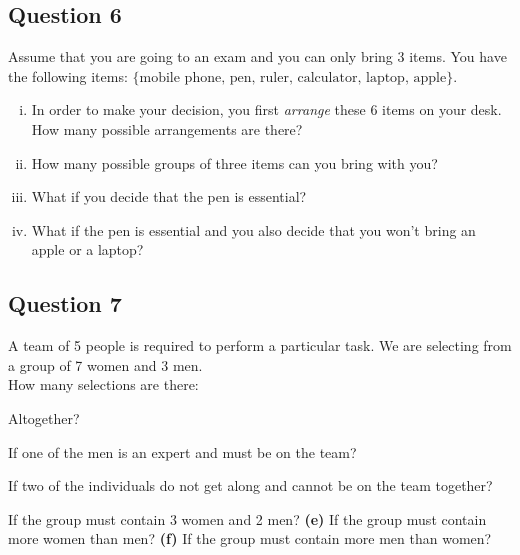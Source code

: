 

\subsection*{Question 6}
Assume that you are going to an exam and you can only bring 3 items. You have the following items: $\{\text{mobile phone, } \text{pen, } \text{ruler, } \text{calculator, } \text{laptop, } \text{apple} \}$.\\[-0.2cm]

\begin{enumerate}[(i)]
\item In order to make your decision, you first \emph{arrange} these 6 items on your desk. How many possible arrangements are there? 
\item How many possible groups of three items can you bring with you? \item What if you decide that the pen is essential? \item What if the pen is essential and you also decide that you won't bring an apple or a laptop?
\end{enumerate}


\subsection*{Question 7}
A team of 5 people is required to perform a particular task. We are selecting from a group of 7 women and 3 men.\\[0.2cm]
How many selections are there:\\[-0.2cm]

\item  Altogether? 
 \item  If one of the men is an expert and must be on the team? 
 \item  If two of the individuals do not get along and cannot be on the team together? 
 \item  If the group must contain 3 women and 2 men? {\bf(e)} If the group must contain more women than men? 
 {\bf(f)} If the group must contain more men than women?
